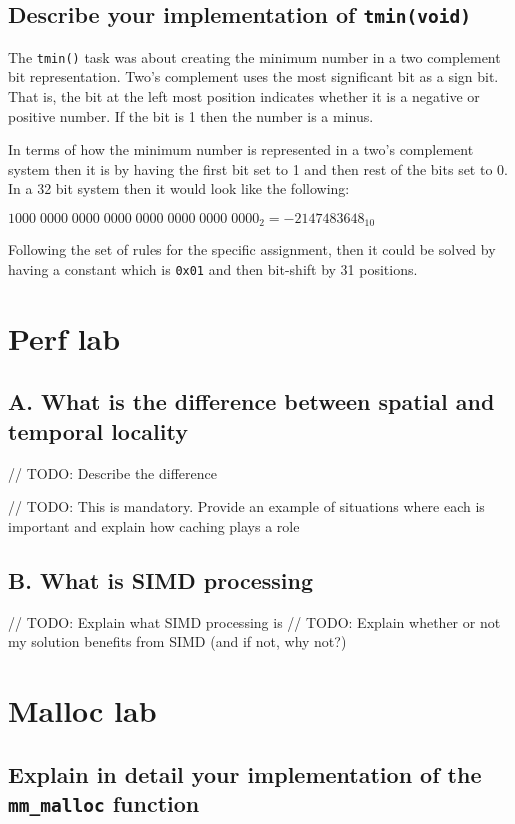 \documentclass[11pt]{article}
\newcommand{\code}[1]{{\colorbox{lightgray!15}{\color{orange}\texttt{#1}}}}
\begin{document}
\subsection{Describe your implementation of \code{tmin(void)}}
The \code{tmin()} task was about creating the minimum number in a two complement bit representation.
Two's complement uses the most significant bit as a sign bit. That is, the bit at the left most position indicates whether 
it is a negative or positive number. If the bit is 1 then the number is a minus. 

In terms of how the minimum number is represented in a two's complement system then it is by having the first bit set to 1 and then rest of the bits set to 0.
In a 32 bit system then it would look like the following:

$1000 \; 0000 \; 0000 \; 0000 \; 0000 \; 0000 \; 0000 \; 0000_2 = -2147483648_{10}$

Following the set of rules for the specific assignment, then it could be solved by having a constant which is \code{0x01}
and then bit-shift by 31 positions.   

\section{Perf lab}

\subsection{A. What is the difference between spatial and temporal locality}

// TODO: Describe the difference

// TODO: This is mandatory. Provide an example of situations where each is important and explain how caching plays a role

\subsection{B. What is SIMD processing}

// TODO: Explain what SIMD processing is
// TODO: Explain whether or not my solution benefits from SIMD (and if not, why not?)
\section{Malloc lab}
\subsection{Explain in detail your implementation of the \code{mm\_malloc} function}
\end{document}
